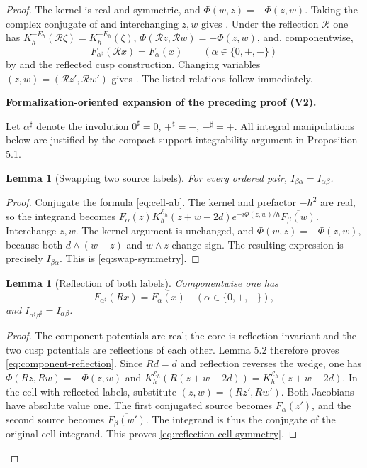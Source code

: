 \documentclass[11pt]{article}
\newtheorem{lemma}[theorem]{Lemma}
\newcommand{\formalisationparentid}{X}
\newenvironment{formalisationaddition}[1]{\par\medskip\begingroup\color{blue}\def\formalisationparentid{#1}\setcounter{formalizationsublemma}{0}\let\lemma\formalizationsublemma\let\endlemma\endformalizationsublemma
  \def\Eo{\mathcal E_h^\circ}\def\EE{\mathcal E_h}\def\phio{\phi_h^\circ}\def\phih{\phi_h}\def\Ho{H_h^{\rm atom}(v^\circ)}\def\Ha{H_h^{\rm atom}}\def\HL{H_h^{L}}\def\Dh{D_h}\def\Log{\operatorname{Log}}\def\ellh{\ell_h}\def\Gp{G_{p,h}}\def\Ast{A_{*,h}}\def\ahat{\widehat{\mathfrak a}_h}\def\ah{\mathfrak a_h}\def\rh{\widehat\rho_h}\def\deltah{\widehat\delta_h}\def\oldref##1{\textup{(##1)}}\def\interface##1{\par\noindent\textit{Analytical interface used here.} ##1\par}\def\finish{\par\noindent\textit{Conclusion of the formalization-oriented expansion.} }\par\noindent\textbf{Formalization-oriented expansion of the preceding proof (V2).}\par\smallskip
}{\par\endgroup\medskip
}
\newcommand{\cR}{\mathcal R}
\begin{document}
\begin{proof}
The kernel is real and symmetric, and $\Phi(w,z)=-\Phi(z,w)$.  Taking the
complex conjugate of  and interchanging $z,w$ gives
.  Under the reflection $\cR$ one has
$K_h^{-E_h}(\cR\zeta)=K_h^{-E_h}(\zeta)$,
$\Phi(\cR z,\cR w)=-\Phi(z,w)$, and, componentwise,
\begin{equation}\label{eq:component-reflection}
 F_{\alpha^\sharp}(\cR x)=\overline{F_\alpha(x)}
 \qquad(\alpha\in\{0,+,-\})
\end{equation}
by  and the reflected cusp construction.
Changing variables $(z,w)=(\cR z',\cR w')$ gives
.  The listed relations follow immediately.

\begin{formalisationaddition}{L5.3}
Let $\alpha^\sharp$ denote the involution $0^\sharp=0$, $+^\sharp=-$, $-^\sharp=+$. All integral manipulations below are justified by the compact-support integrability argument in Proposition 5.1.

\begin{lemma}[Swapping two source labels]\label{sublemma:L5-3-swap}
For every ordered pair, $I_{\beta\alpha}=\overline{I_{\alpha\beta}}$.
\end{lemma}
\begin{proof}
Conjugate the formula \eqref{eq:cell-ab}. The kernel and prefactor $-h^2$ are real, so the integrand becomes
$F_\alpha(z)K_h^{\mathcal E_h}(z+w-2d)e^{-i\Phi(z,w)/h}\overline{F_\beta(w)}$.
Interchange $z,w$. The kernel argument is unchanged, and
$\Phi(w,z)=-\Phi(z,w)$, because both $d\wedge(w-z)$ and $w\wedge z$ change sign. The resulting expression is precisely $I_{\beta\alpha}$. This is \eqref{eq:swap-symmetry}.
\end{proof}

\begin{lemma}[Reflection of both labels]\label{sublemma:L5-3-reflection}
Componentwise one has
\begin{equation*}
 F_{\alpha^\sharp}(Rx)=\overline{F_\alpha(x)}\quad(\alpha\in\{0,+,-\}),
\end{equation*}
and $I_{\alpha^\sharp\beta^\sharp}=\overline{I_{\alpha\beta}}$.
\end{lemma}
\begin{proof}
The component potentials are real; the core is reflection-invariant and the two cusp potentials are reflections of each other. Lemma 5.2 therefore proves \eqref{eq:component-reflection}.
Since $Rd=d$ and reflection reverses the wedge, one has
$\Phi(Rz,Rw)=-\Phi(z,w)$ and
$K_h^{\mathcal E_h}(R(z+w-2d))=K_h^{\mathcal E_h}(z+w-2d)$.
In the cell with reflected labels, substitute $(z,w)=(Rz',Rw')$. Both Jacobians have absolute value one. The first conjugated source becomes $F_\alpha(z')$, and the second source becomes $\overline{F_\beta(w')}$. The integrand is thus the conjugate of the original cell integrand. This proves \eqref{eq:reflection-cell-symmetry}.
\end{proof}


\end{formalisationaddition}
\end{proof}
\end{document}

